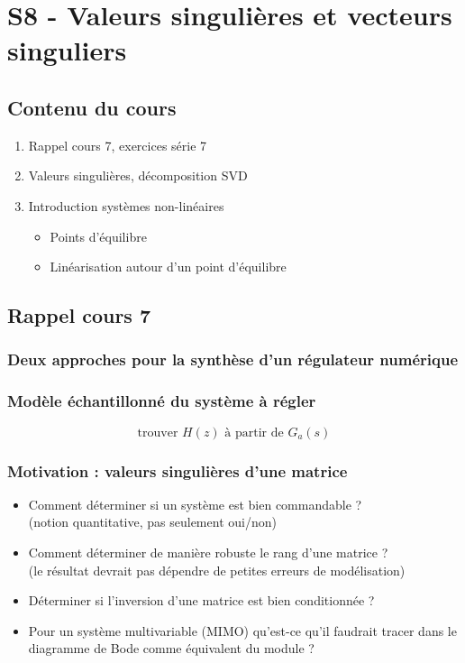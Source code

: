 \documentclass[document.tex]{subfiles}
\begin{document}
\section{S8 - Valeurs singulières et vecteurs singuliers}

\subsection{Contenu du cours}

\begin{enumerate}
\item Rappel cours 7, exercices série 7
\item Valeurs singulières, décomposition SVD
\item Introduction systèmes non-linéaires
\begin{itemize}
\item Points d'équilibre
\item Linéarisation autour d'un point d'équilibre
\end{itemize}
\end{enumerate}

\subsection{Rappel cours 7}

\subsubsection{Deux approches pour la synthèse d'un régulateur numérique}


\subsubsection{Modèle échantillonné du système à régler}


$$ \boxed{\text{trouver $H(z)$ à partir de $G_a(s)$
}} $$

\subsubsection{Motivation : valeurs singulières d'une matrice}

\begin{itemize}
\item Comment déterminer si un système est bien commandable ?\\
(notion quantitative, pas seulement oui/non)
\item Comment déterminer de manière robuste le rang d'une matrice ?\\
(le résultat devrait pas dépendre de petites erreurs de modélisation)
\item Déterminer si l'inversion d'une matrice est bien conditionnée ?
\item Pour un système multivariable (MIMO) qu'est-ce qu'il faudrait tracer dans le diagramme de Bode comme équivalent du module ?
\end{itemize}
\end{document}
